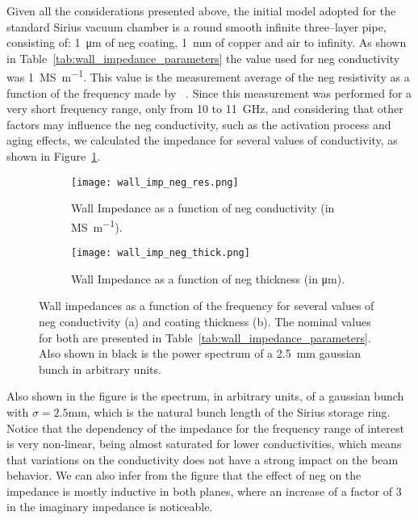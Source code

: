     Given all the considerations presented above, the initial model adopted for the standard Sirius vacuum chamber is a round smooth infinite three--layer pipe, consisting of: \SI{1}{\micro\meter} of \gls{neg} coating, \SI{1}{\milli\meter} of copper and air to infinity. As shown in Table~\ref{tab:wall_impedance_parameters} the value used for \gls{neg} conductivity was \SI{1}{\mega\siemens\per\meter}. This value is the measurement average of the \gls{neg} resistivity as a function of the frequency made by ~. Since this measurement was performed for a very short frequency range, only from \SI{10}{} to \SI{11}{\giga\hertz}, and considering that other factors may influence the \gls{neg} conductivity, such as the activation process and aging effects, we calculated the impedance for several values of conductivity, as shown in Figure~\ref{fig:wall_impedance_neg_res}.
    \begin{figure}
        \def \mysize {\textwidth}
        \centering
        \begin{subfigure}[c]{\textwidth}
            \centering
            \texttt{[image: wall\_imp\_neg\_res.png]}
            \caption{Wall Impedance as a function of \gls{neg} conductivity (in \si{\mega\siemens\per\meter}).}
            \label{fig:wall_impedance_neg_res}
        \end{subfigure}
        \begin{subfigure}[c]{\textwidth}
            \centering
            \texttt{[image: wall\_imp\_neg\_thick.png]}
            \caption{Wall Impedance as a function of \gls{neg} thickness (in \si{\micro\meter}).}
            \label{fig:wall_impedance_neg_thick}
        \end{subfigure}
        \caption[Neg effect on impedance.]{Wall impedances as a function of the frequency for several values of \gls{neg} conductivity (a) and coating thickness (b). The nominal values for both are presented in Table~\ref{tab:wall_impedance_parameters}. Also shown in black is the power spectrum of a \SI{2.5}{\milli\meter} gaussian bunch in arbitrary units.}
        \label{fig:wall_impedance_neg}
    \end{figure}
    Also shown in the figure is the spectrum, in arbitrary units, of a gaussian bunch with $\sigma=2.5$\si{\milli\meter}, which is the natural bunch length of the Sirius storage ring. Notice that the dependency of the impedance for the frequency range of interest is very non-linear, being almost saturated for lower conductivities, which means that variations on the conductivity does not have a strong impact on the beam behavior. We can also infer from the figure that the effect of \gls{neg} on the impedance is mostly inductive in both planes, where an increase of a factor of \SI{3}{} in the imaginary impedance is noticeable.

